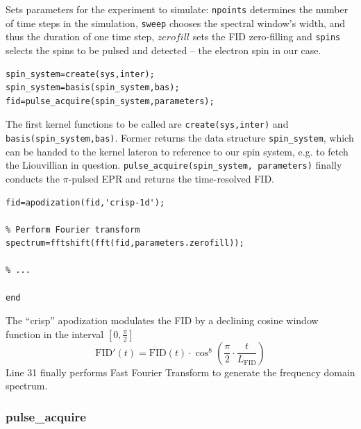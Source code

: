 \documentclass[11.5pt,a4paper]{article}
\begin{document}
Sets parameters for the experiment to simulate: \verb$npoints$ determines the number of time steps in the simulation, \verb$sweep$ chooses the spectral window's width, and thus the duration of one time step, $zerofill$ sets the FID zero-filling and \verb$spins$ selects the spins to be pulsed and detected -- the electron spin in our case.
\begin{lstlisting}[firstnumber=last]
% Run Spinach
spin_system=create(sys,inter);
spin_system=basis(spin_system,bas);
fid=pulse_acquire(spin_system,parameters);
\end{lstlisting}
The first kernel functions to be called are \verb$create(sys,inter)$ and \verb$basis(spin_system,bas)$. Former returns the data structure \verb$spin_system$, which can be handed to the kernel lateron to reference to our spin system, e.g. to fetch the Liouvillian in question.
\verb$pulse_acquire(spin_system, parameters)$ finally conducts the $\pi$-pulsed EPR and returns the time-resolved FID.
\begin{lstlisting}[firstnumber=last]
% Apodization
fid=apodization(fid,'crisp-1d');

% Perform Fourier transform
spectrum=fftshift(fft(fid,parameters.zerofill));

% ...

end
\end{lstlisting}
The ``crisp'' apodization modulates the FID by a declining cosine window function in the interval $[0,\tfrac{\pi}{2}]$
\begin{equation}
 \text{FID}'(t) = \text{FID}(t) \cdot \cos^8 \left( \frac{\pi}{2} \cdot \frac{t}{L_\text{FID}} \right)
\end{equation}
Line 31 finally performs Fast Fourier Transform to generate the frequency domain spectrum.


\subsubsection{pulse\_acquire}
\end{document}

